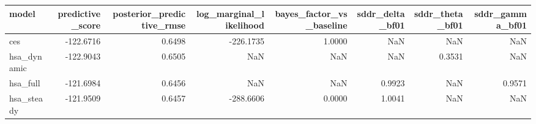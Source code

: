 \begin{tabular}{lrrrrrrr}
\toprule
model & predictive\_score & posterior\_predictive\_rmse & log\_marginal\_likelihood & bayes\_factor\_vs\_baseline & sddr\_delta\_bf01 & sddr\_theta\_bf01 & sddr\_gamma\_bf01 \\
\midrule
ces & -122.6716 & 0.6498 & -226.1735 & 1.0000 & NaN & NaN & NaN \\
hsa\_dynamic & -122.9043 & 0.6505 & NaN & NaN & NaN & 0.3531 & NaN \\
hsa\_full & -121.6984 & 0.6456 & NaN & NaN & 0.9923 & NaN & 0.9571 \\
hsa\_steady & -121.9509 & 0.6457 & -288.6606 & 0.0000 & 1.0041 & NaN & NaN \\
\bottomrule
\end{tabular}
